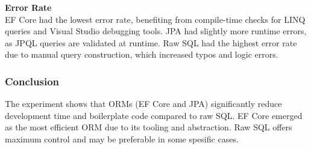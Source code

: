 \noindent
\textbf{Error Rate} \\
EF Core had the lowest error rate, benefiting from compile-time checks for LINQ queries and Visual Studio debugging tools. JPA had slightly more runtime errors, as JPQL queries are validated at runtime. Raw SQL had the highest error rate due to manual query construction, which increased typos and logic errors.

\subsubsection{Conclusion}
The experiment shows that ORMs (EF Core and JPA) significantly reduce development time and boilerplate code compared to raw SQL. EF Core emerged as the most efficient ORM due to its tooling and abstraction. Raw SQL offers maximum control and may be preferable in some spesific cases.

